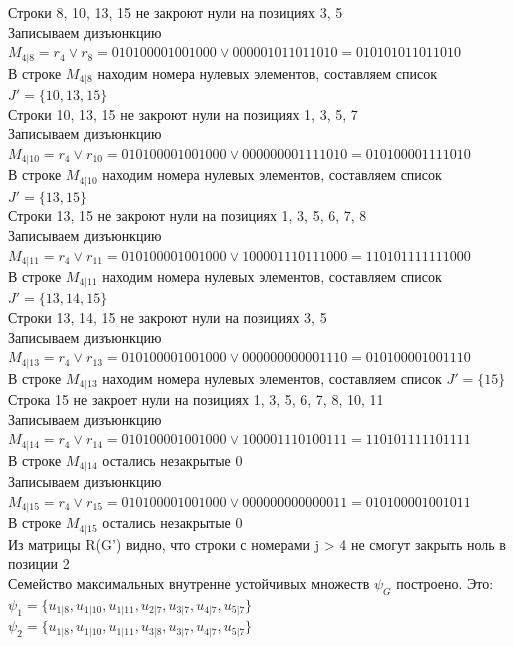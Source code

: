 \documentclass[12pt,a4paper]{report}
\begin{document}
Строки 8, 10, 13, 15 не закроют нули на позициях 3, 5 \\
Записываем дизъюнкцию $M_{4 | 8} = r_{4}\vee r_{8} = 010100001001000 \vee 000001011011010 = 010101011011010$ \\
В строке $M_{4 | 8}$ находим номера нулевых элементов, составляем список $J' = \{10, 13, 15\}$ \\
Строки 10, 13, 15 не закроют нули на позициях 1, 3, 5, 7 \\
Записываем дизъюнкцию $M_{4 | 10} = r_{4}\vee r_{10} = 010100001001000 \vee 000000001111010 = 010100001111010$ \\
В строке $M_{4 | 10}$ находим номера нулевых элементов, составляем список $J' = \{13, 15\}$ \\
Строки 13, 15 не закроют нули на позициях 1, 3, 5, 6, 7, 8 \\
Записываем дизъюнкцию $M_{4 | 11} = r_{4}\vee r_{11} = 010100001001000 \vee 100001110111000 = 110101111111000$ \\
В строке $M_{4 | 11}$ находим номера нулевых элементов, составляем список $J' = \{13, 14, 15\}$ \\
Строки 13, 14, 15 не закроют нули на позициях 3, 5 \\
Записываем дизъюнкцию $M_{4 | 13} = r_{4}\vee r_{13} = 010100001001000 \vee 000000000001110 = 010100001001110$ \\
В строке $M_{4 | 13}$ находим номера нулевых элементов, составляем список $J' = \{15\}$ \\
Строка 15 не закроет нули на позициях 1, 3, 5, 6, 7, 8, 10, 11 \\
Записываем дизъюнкцию $M_{4 | 14} = r_{4}\vee r_{14} = 010100001001000 \vee 100001110100111 = 110101111101111$ \\
В строке $M_{4 | 14}$ остались незакрытые $0$ \\
Записываем дизъюнкцию $M_{4 | 15} = r_{4}\vee r_{15} = 010100001001000 \vee 000000000000011 = 010100001001011$ \\
В строке $M_{4 | 15}$ остались незакрытые $0$ \\
Из матрицы R(G') видно, что строки с номерами j > 4 не смогут закрыть ноль в позиции 2\\
Семейство максимальных внутренне устойчивых множеств $\psi_G$ построено. Это:\\
$\psi_{1} = \{u_{1 | 8},u_{1 | 10},u_{1 | 11},u_{2 | 7},u_{3 | 7},u_{4 | 7},u_{5 | 7}\}$ \\
$\psi_{2} = \{u_{1 | 8},u_{1 | 10},u_{1 | 11},u_{3 | 8},u_{3 | 7},u_{4 | 7},u_{5 | 7}\}$ \\
\end{document}
